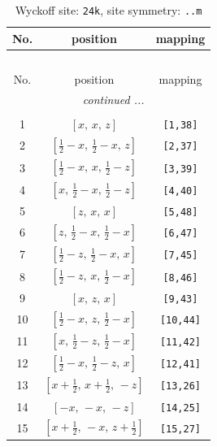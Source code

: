 \documentclass[fleqn,8pt]{jsarticle}
\begin{document}
\begin{longtable}{ccc}
\caption{Wyckoff site: {\tt 24k}, site symmetry: {\tt ..m}}
 \\
 \hline \hline
No. & position & mapping \\ \hline \endfirsthead

\multicolumn{2}{l}{\tablename\ \thetable{}} \\
 \hline \hline
No. & position & mapping \\ \hline \endhead

 \hline \hline
\multicolumn{2}{r}{\footnotesize\it continued ...} \\ \endfoot

 \hline \hline
\multicolumn{2}{r}{} \\ \endlastfoot

1 & $\left[ x,\, x,\, z \right]$ & {\tt [1,38]} \\ \hline
2 & $\left[ \frac{1}{2} - x,\, \frac{1}{2} - x,\, z \right]$ & {\tt [2,37]} \\ \hline
3 & $\left[ \frac{1}{2} - x,\, x,\, \frac{1}{2} - z \right]$ & {\tt [3,39]} \\ \hline
4 & $\left[ x,\, \frac{1}{2} - x,\, \frac{1}{2} - z \right]$ & {\tt [4,40]} \\ \hline
5 & $\left[ z,\, x,\, x \right]$ & {\tt [5,48]} \\ \hline
6 & $\left[ z,\, \frac{1}{2} - x,\, \frac{1}{2} - x \right]$ & {\tt [6,47]} \\ \hline
7 & $\left[ \frac{1}{2} - z,\, \frac{1}{2} - x,\, x \right]$ & {\tt [7,45]} \\ \hline
8 & $\left[ \frac{1}{2} - z,\, x,\, \frac{1}{2} - x \right]$ & {\tt [8,46]} \\ \hline
9 & $\left[ x,\, z,\, x \right]$ & {\tt [9,43]} \\ \hline
10 & $\left[ \frac{1}{2} - x,\, z,\, \frac{1}{2} - x \right]$ & {\tt [10,44]} \\ \hline
11 & $\left[ x,\, \frac{1}{2} - z,\, \frac{1}{2} - x \right]$ & {\tt [11,42]} \\ \hline
12 & $\left[ \frac{1}{2} - x,\, \frac{1}{2} - z,\, x \right]$ & {\tt [12,41]} \\ \hline
13 & $\left[ x + \frac{1}{2},\, x + \frac{1}{2},\, - z \right]$ & {\tt [13,26]} \\ \hline
14 & $\left[ - x,\, - x,\, - z \right]$ & {\tt [14,25]} \\ \hline
15 & $\left[ x + \frac{1}{2},\, - x,\, z + \frac{1}{2} \right]$ & {\tt [15,27]} \\ \hline

\end{longtable}
\end{document}
